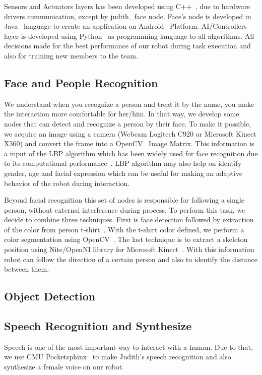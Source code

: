 Sensors and Actuators layers has been developed using C++~\cite{stroustrup:1986}, due to hardware drivers communication, except by judith\_face node. Face's node is developed in Java~\cite{joy:2000} language to create an application on Android~\cite{android:2016} Platform. AI/Controllers layer is developed using Python~\cite{vanrossum:2010} as programming language to all algorithms. All decisions made for the best performance of our robot during task execution and also for training new members to the team.

\subsection{Face and People Recognition}\label{face-people-recognition}
We understand when you recognize a person and treat it by the name, you make the interaction more comfortable for her/him. In that way, we develop some nodes that can detect and recognize a person by their face. To make it possible, we acquire an image using a camera (Webcam Logitech C920 or Microsoft Kinect X360) and convert the frame into a OpenCV~\cite{bradski:2000} Image Matrix. This information is a input of the LBP algorithm which has been widely used for face recognition due to its computational performance~\cite{ahonen:2006,yang:2007,shan:2012,ylioinas:2012,samadi:2013}. LBP algorithm may also help on identify gender, age and facial expression which can be useful for making an adaptive behavior of the robot during interaction.

Beyond facial recognition this set of nodes is responsible for following a single person, without external interference during process. To perform this task, we decide to combine three techniques. First is face detection followed by extraction of the color from person t-shirt~\cite{pulli:2012,laganiere:2011,baggio:2012}. With the t-shirt color defined, we perform a color segmentation using OpenCV~\cite{kang:2008,oliveira:2009,culjak:2012}. The last technique is to extract a skeleton position using Nite/OpenNI library for Microsoft Kinect~\cite{openni:2011}. With this information robot can follow the direction of a certain person and also to identify the distance between them.

\subsection{Object Detection}\label{object-detection}

\subsection{Speech Recognition and Synthesize}\label{speech}
Speech is one of the most important way to interact with a human. Due to that, we use CMU Pocketsphinx~\cite{huggins:2006} to make Judith's speech recognition and also synthesize a female voice on our robot.


